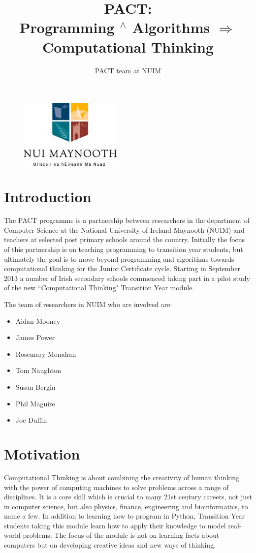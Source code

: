 \documentclass{article}
\begin{document}
\title{\large{\textbf{PACT: \\ Programming $^{\wedge}$ Algorithms $\Longrightarrow$ Computational Thinking}}}

\author{PACT team at NUIM}

\begin{figure}
    \centering
    \includegraphics[width = 5cm]{nuim_large}
    \label{logo}
\end{figure}
\maketitle

\section{Introduction}
The PACT programme is a partnership between researchers in the department of Computer Science at the National University of Ireland Maynooth (NUIM) and teachers at selected post primary schools around the country. Initially the focus of this partnership is on teaching programming to transition year students, but ultimately the goal is to move beyond programming and algorithms towards computational thinking for the Junior Certificate cycle. Starting in September 2013 a number of Irish secondary schools commenced taking part in a pilot study of the new ``Computational Thinking" Transition Year module.

The team of researchers in NUIM who are involved are: 

\begin{itemize}
  \item Aidan Mooney
  \item James Power
  \item Rosemary Monahan
  \item Tom Naughton
  \item Susan Bergin
  \item Phil Maguire
  \item Joe Duffin
\end{itemize}

\section{Motivation}
Computational Thinking is about combining the creativity of human thinking with the power of computing machines to solve problems across a range of disciplines. It is a core skill which is crucial to many 21st century careers, not just in computer science, but also physics, finance, engineering and bioinformatics, to name a few. In addition to learning how to program in Python, Transition Year students taking this module learn how to apply their knowledge to model real-world problems. The focus of the module is not on learning facts about computers but on developing creative ideas and new ways of thinking.
\end{document}
